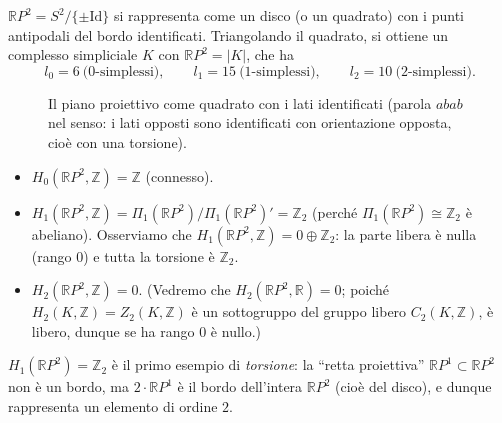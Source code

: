 $\mathbb{R}P^2 = S^2/\{\pm\mathrm{Id}\}$ si rappresenta come un disco (o un quadrato) con i punti antipodali del bordo identificati. Triangolando il quadrato, si ottiene un complesso simpliciale $K$ con $\mathbb{R}P^2 = |K|$, che ha
\[
l_0 = 6 \ \text{($0$-simplessi)}, \qquad l_1 = 15 \ \text{($1$-simplessi)}, \qquad l_2 = 10 \ \text{($2$-simplessi)}.
\]

\begin{figure}[H]
    \centering
    \caption{Il piano proiettivo come quadrato con i lati identificati (parola $abab$ nel senso: i lati opposti sono identificati con orientazione opposta, cio\`e con una torsione).}
\end{figure}

\begin{itemize}
    \item $H_0(\mathbb{R}P^2, \mathbb{Z}) = \mathbb{Z}$ (connesso).
    \item $H_1(\mathbb{R}P^2, \mathbb{Z}) = \Pi_1(\mathbb{R}P^2)/\Pi_1(\mathbb{R}P^2)' = \mathbb{Z}_2$ (perch\'e $\Pi_1(\mathbb{R}P^2) \cong \mathbb{Z}_2$ \`e abeliano). Osserviamo che $H_1(\mathbb{R}P^2, \mathbb{Z}) = 0 \oplus \mathbb{Z}_2$: la parte libera \`e nulla (rango $0$) e tutta la torsione \`e $\mathbb{Z}_2$.
    \item $H_2(\mathbb{R}P^2, \mathbb{Z}) = 0$. (Vedremo che $H_2(\mathbb{R}P^2, \mathbb{R}) = 0$; poich\'e $H_2(K, \mathbb{Z}) = Z_2(K, \mathbb{Z})$ \`e un sottogruppo del gruppo libero $C_2(K, \mathbb{Z})$, \`e libero, dunque se ha rango $0$ \`e nullo.)
\end{itemize}

\begin{intuizione}
$H_1(\mathbb{R}P^2) = \mathbb{Z}_2$ \`e il primo esempio di \emph{torsione}: la ``retta proiettiva'' $\mathbb{R}P^1 \subset \mathbb{R}P^2$ non \`e un bordo, ma $2 \cdot \mathbb{R}P^1$ \`e il bordo dell'intera $\mathbb{R}P^2$ (cio\`e del disco), e dunque rappresenta un elemento di ordine $2$.
\end{intuizione}

